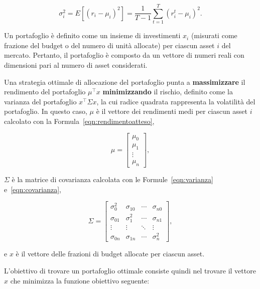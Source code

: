 \begin{equation}\label{eqn:covarianza}
    \sigma_i^2 = E[{(r_i - \mu_i)}^2] = \frac{1}{T-1} \sum_{t=1}^T {(r_i^t - \mu_i)}^2. 
\end{equation}

Un portafoglio è definito come un insieme di investimenti \(x_i\) (misurati come frazione 
del budget o del numero di unità allocate) per ciascun asset \(i\) del mercato. Pertanto, 
il portafoglio è composto da un vettore di numeri reali con dimensioni pari al 
numero di asset considerati. 

Una strategia ottimale di allocazione del portafoglio punta 
a \textbf{massimizzare} il rendimento del portafoglio \(\mu^\top x\) \textbf{minimizzando} 
il rischio, definito come la varianza del portafoglio \(x^\top \Sigma x\), la cui 
radice quadrata rappresenta la volatilità del portafoglio. In questo caso, 
\(\mu\) è il vettore dei rendimenti medi per ciascun asset \(i\) calcolato con la 
Formula~\ref{eqn:rendimentoatteso}, 

\begin{equation}\label{eqn:matriceRendimentiAttesi}
    \mu =
    \begin{bmatrix}
    \mu_0 \\
    \mu_1 \\
    \vdots \\
    \mu_n
    \end{bmatrix},
\end{equation}

\(\Sigma\) è la matrice di covarianza calcolata con le Formule~\ref{eqn:varianza} 
e~\ref{eqn:covarianza}, 

\begin{equation}\label{eqn:matriceCovarianza}
    \Sigma =
    \begin{bmatrix}
    \sigma_0^2 & \sigma_{10} & \cdots & \sigma_{n0} \\
    \sigma_{01} & \sigma_1^2 & \cdots & \sigma_{n1} \\
    \vdots & \vdots & \ddots & \vdots \\
    \sigma_{0n} & \sigma_{1n} & \cdots & \sigma_n^2
    \end{bmatrix},
\end{equation}

e \(x\) è il vettore delle frazioni di budget allocate per ciascun asset. 

L'obiettivo di trovare un portafoglio ottimale consiste 
quindi nel trovare il vettore \(x\) che minimizza la funzione obiettivo seguente:

